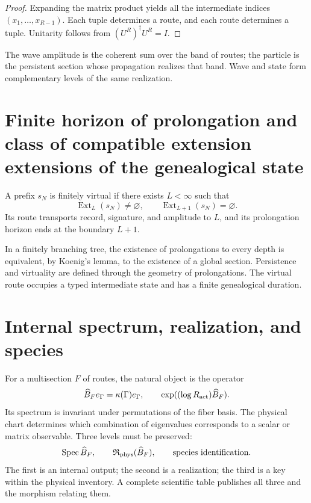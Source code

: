 \begin{proof}
Expanding the matrix product yields all the intermediate indices
\((x_1,\ldots,x_{R-1})\). Each tuple determines a route, and each route determines
a tuple. Unitarity follows from
\((U^R)^\dagger U^R=I\).
\end{proof}

The wave amplitude is the coherent sum over the band of routes; the
particle is the persistent section whose propagation realizes that band. Wave
and state form complementary levels of the same realization.

\section{Finite horizon of prolongation and class of compatible extension extensions of the genealogical state}

\begin{definition}
\label{def:ruta-virtual-finita-bisagra}
A prefix \(s_N\) is finitely virtual if there exists \(L<\infty\) such that
\[
 \operatorname{Ext}_L(s_N)\neq\varnothing,
 \qquad
 \operatorname{Ext}_{L+1}(s_N)=\varnothing.
\]
Its route transports record, signature, and amplitude to \(L\), and its
prolongation horizon ends at the boundary \(L+1\).
\end{definition}

In a finitely branching tree, the existence of prolongations to every
depth is equivalent, by Koenig's lemma, to the existence of a global
section. Persistence and virtuality are defined through the
geometry of prolongations. The virtual route occupies a typed intermediate
state and has a finite genealogical duration.

\section{Internal spectrum, realization, and species}

For a multisection \(F\) of routes, the natural object is the operator
\[
 \widehat B_F e_\Gamma
 =\kappa(\Gamma)e_\Gamma,
 \qquad
 \exp((\log R_{\rm act})\widehat B_F).
\]
Its spectrum is invariant under permutations of the fiber basis. The physical
chart determines which combination of eigenvalues corresponds to a scalar
or matrix observable. Three levels must be preserved:
\[
 \operatorname{Spec}\widehat B_F,
 \qquad
 \mathfrak R_{\rm phys}(\widehat B_F),
 \qquad
 \text{species identification}.
\]
The first is an internal output; the second is a realization; the third
is a key within the physical inventory. A complete scientific table
publishes all three and the morphism relating them.

